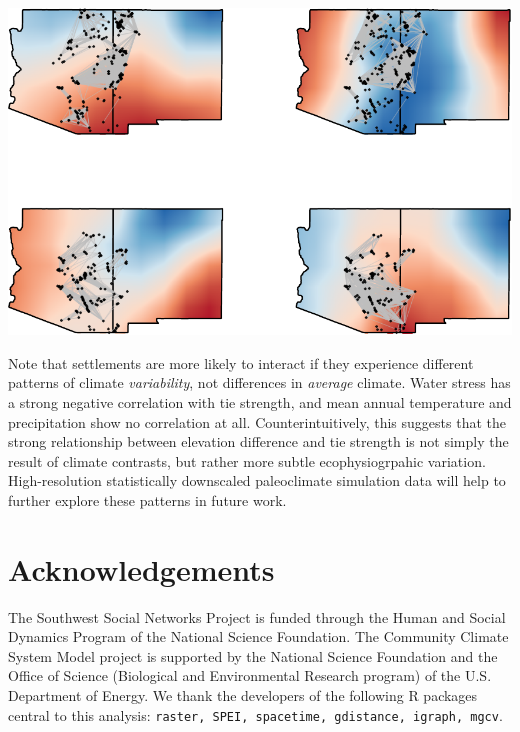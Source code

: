 \documentclass[a0,final]{a0poster}
\begin{document}
\begin{multicols}{3}
\begin{center}
    \includegraphics[width=.8\columnwidth]{images/eof3_net}
\end{center}

\vspace*{\fill}

Note that settlements are more likely to interact if they experience different patterns of climate \textit{variability}, not differences in \textit{average} climate. Water stress has a strong negative correlation with tie strength, and mean annual temperature and precipitation show no correlation at all. Counterintuitively, this suggests that the strong relationship between elevation difference and tie strength is not simply the result of climate contrasts, but rather more subtle ecophysiogrpahic variation. High-resolution statistically downscaled paleoclimate simulation data will help to further explore these patterns in future work.

\vspace*{\fill}

\footnotesize

\section*{Acknowledgements}
The Southwest Social Networks Project is funded through the Human and Social Dynamics Program of the National Science Foundation. The Community Climate System Model project is supported by the National Science Foundation and the Office of Science (Biological and Environmental Research program) of the U.S. Department of Energy.
We thank the developers of the following R packages central to this analysis: \texttt{raster, SPEI, spacetime, gdistance, igraph, mgcv}.




\end{multicols}
\end{document}
